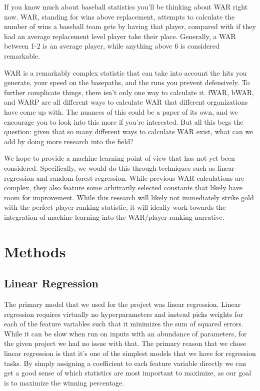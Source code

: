 \documentclass{article}
\begin{document}
	If you know much about baseball statistics you’ll be thinking about WAR right now. WAR, standing for wins above replacement, attempts to calculate the number of wins a baseball team gets by having that player, compared with if they had an average replacement level player take their place. Generally, a WAR between 1-2\cite{war} is an average player, while anything above 6 is considered remarkable. 
	
	WAR is a remarkably complex statistic that can take into account the hits you generate, your speed on the basepaths, and the runs you prevent defensively. To further complicate things, there isn’t only one way to calculate it. fWAR, bWAR, and WARP are all different ways to calculate WAR that different organizations have come up with. The nuances of this could be a paper of its own, and we encourage you to look into this more if you’re interested. But all this begs the question: given that so many different ways to calculate WAR exist, what can we add by doing more research into the field?
	
    We hope to provide a machine learning point of view that has not yet been considered. Specifically, we would do this through techniques such as linear regression and random forest regression. While previous WAR calculations are complex, they also feature some arbitrarily selected constants that likely have room for improvement. While this research will likely not immediately strike gold with the perfect player ranking statistic, it will ideally work towards the integration of machine learning into the WAR/player ranking narrative.

\section{Methods}
\label{methods}

\subsection{Linear Regression}
\label{linearreg}

The primary model that we used for the project was linear regression.  Linear regression requires virtually no hyperparameters and instead picks weights for each of the feature variables such that it minimizes the sum of squared errors. While it can be slow when run on inputs with an abundance of parameters, for the given project we had no issue with that. The primary reason that we chose linear regression is that it’s one of the simplest models that we have for regression tasks. By simply assigning a coefficient to each feature variable directly we can get a good sense of which statistics are most important to maximize, as our goal is to maximize the winning percentage. 
\end{document}
